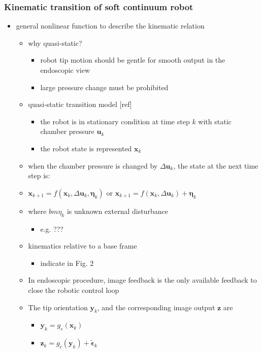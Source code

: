 \documentclass[journal,onecolumn]{IEEEtran}
\begin{document}
\subsubsection{Kinematic transition of soft continuum robot}
\label{sec:orge3ab473}
\begin{itemize}
\item general nonlinear function to describe the kinematic relation
\begin{itemize}
\item why quasi-static?
\begin{itemize}
\item robot tip motion should be gentle for smooth output in the endoscopic view
\item large pressure change must be prohibited
\end{itemize}
\item quasi-static transition model [ref]
\begin{itemize}
\item the robot is in stationary condition at time step \(k\) with static chamber pressure \(\bm{u}_k\)
\item the robot state is represented \(\bm{x}_k\)
\end{itemize}
\item when the chamber pressure is changed by \(\Delta\bm{u}_k\), the state at the next time step is:
\item \(\bm{x}_{k+1} = f(\bm{x}_k,\Delta\bm{u}_k, \bm{\eta}_k)\) or \(\bm{x}_{k+1} = f(\bm{x}_k,\Delta\bm{u}_k) + \bm{\eta}_k\)
\item where \(bm{\eta}_k\) is unknown external disturbance
\begin{itemize}
\item e.g. ???
\end{itemize}
\item kinematics relative to a base frame
\begin{itemize}
\item indicate in Fig. 2
\end{itemize}
\item In endoscopic procedure, image feedback is the only available feedback to close the robotic control loop
\item The tip orientation \(\bm{y}_k\), and the corresponding image output \(\bm{z}\) are 
\begin{itemize}
\item \(\bm{y}_k = g_e(\bm{x}_k)\)
\item \(\bm{z}_k = g_c(\bm{y}_k) + \bm{\tilde \epsilon}_k\)

\end{itemize}
\end{itemize}
\end{itemize}
\end{document}
